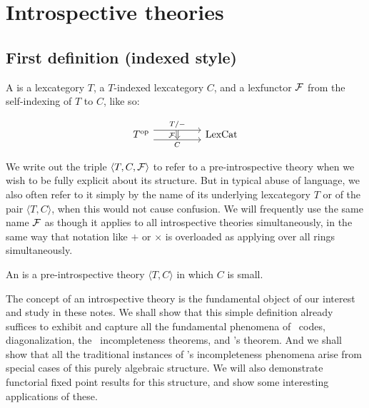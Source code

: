 \section{Introspective theories}

\subsection{First definition (indexed style)}

\begin{definition} \label{DefnPreIntrospIndexed}
A  is a lexcategory $T$, a $T$-indexed lexcategory $C$, and a lexfunctor $\mathcal{F}$ from the self-indexing of $T$ to $C$, like so:

\[\begin{tikzcd}
	{\op{T}} && {\LexCat}
	\arrow["{T/-}"{name=0}, from=1-1, to=1-3, shift left=2]
	\arrow["{C}"{name=1, swap}, from=1-1, to=1-3, shift right=2]
	\arrow[Rightarrow, "{\introF}"', from=0, to=1]
\end{tikzcd}\]
\end{definition}

We write out the triple $\langle T, C, \mathcal{F} \rangle$ to refer to a pre-introspective theory when we wish to be fully explicit about its structure. But in typical abuse of language, we also often refer to it simply by the name of its underlying lexcategory $T$ or of the pair $\langle T, C \rangle$, when this would not cause confusion. We will frequently use the same name $\mathcal{F}$ as though it applies to all introspective theories simultaneously, in the same way that notation like $+$ or $\times$ is overloaded as applying over all rings simultaneously.

\begin{definition} \label{DefnIntrospIndexed}
An  is a pre-introspective theory $\langle T, C \rangle$ in which $C$ is small.
\end{definition}

The concept of an introspective theory is the fundamental object of our interest and study in these notes. We shall show that this simple definition already suffices to exhibit and capture all the fundamental phenomena of \Goedel\ codes, diagonalization, the \Goedel\ incompleteness theorems, and \Loeb's theorem. And we shall show that all the traditional instances of \Goedel's incompleteness phenomena arise from special cases of this purely algebraic structure. We will also demonstrate functorial fixed point results for this structure, and show some interesting applications of these.

